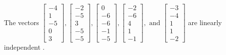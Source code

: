 \begin{exercise}
\begin{exerciseStatement}
  \end{exerciseStatement}
  \begin{exerciseAnswer}
   The vectors \(\left[\begin{array}{r}
-4 \\
1 \\
-5 \\
0 \\
3
\end{array}\right] , \left[\begin{array}{r}
-2 \\
-5 \\
3 \\
-5 \\
-5
\end{array}\right] , \left[\begin{array}{r}
0 \\
-6 \\
-6 \\
-1 \\
-5
\end{array}\right] , \left[\begin{array}{r}
-2 \\
-6 \\
4 \\
1 \\
-1
\end{array}\right] , \text{ and } \left[\begin{array}{r}
-3 \\
-4 \\
1 \\
1 \\
-2
\end{array}\right]\) are 
  	 linearly independent  .
  


  \end{exerciseAnswer}
\end{exercise}